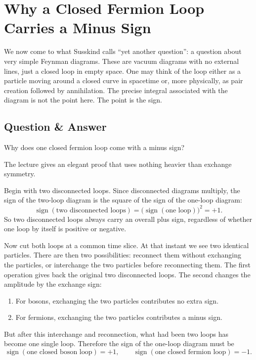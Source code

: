 \section{Why a Closed Fermion Loop Carries a Minus Sign}

We now come to what Susskind calls ``yet another question'': a question about very simple Feynman diagrams. These are vacuum diagrams with no external lines, just a closed loop in empty space. One may think of the loop either as a particle moving around a closed curve in spacetime or, more physically, as pair creation followed by annihilation. The precise integral associated with the diagram is not the point here. The point is the sign.

\subsection{Question \& Answer}

Why does one closed fermion loop come with a minus sign?

The lecture gives an elegant proof that uses nothing heavier than exchange symmetry.

Begin with two disconnected loops. Since disconnected diagrams multiply, the sign of the two-loop diagram is the square of the sign of the one-loop diagram:
\begin{equation}
\operatorname{sign}(\text{two disconnected loops})
=
\bigl(\operatorname{sign}(\text{one loop})\bigr)^2
=
+1.
\end{equation}
So two disconnected loops always carry an overall plus sign, regardless of whether one loop by itself is positive or negative.

Now cut both loops at a common time slice. At that instant we see two identical particles. There are then two possibilities: reconnect them without exchanging the particles, or interchange the two particles before reconnecting them. The first operation gives back the original two disconnected loops. The second changes the amplitude by the exchange sign:
\begin{enumerate}
\item For bosons, exchanging the two particles contributes no extra sign.
\item For fermions, exchanging the two particles contributes a minus sign.
\end{enumerate}
But after this interchange and reconnection, what had been two loops has become one single loop. Therefore the sign of the one-loop diagram must be
\begin{equation}
\operatorname{sign}(\text{one closed boson loop})=+1,
\qquad
\operatorname{sign}(\text{one closed fermion loop})=-1.
\end{equation}

